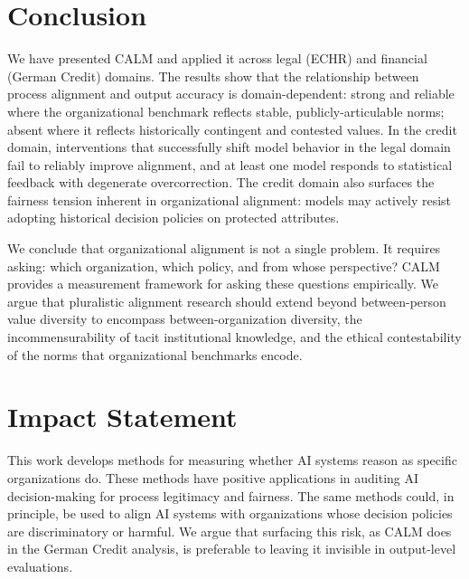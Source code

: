 \documentclass{article}
\begin{document}

\section{Conclusion}

We have presented CALM and applied it across legal (ECHR) and financial (German Credit) domains. The results show that the relationship between process alignment and output accuracy is domain-dependent: strong and reliable where the organizational benchmark reflects stable, publicly-articulable norms; absent where it reflects historically contingent and contested values. In the credit domain, interventions that successfully shift model behavior in the legal domain fail to reliably improve alignment, and at least one model responds to statistical feedback with degenerate overcorrection. The credit domain also surfaces the fairness tension inherent in organizational alignment: models may actively resist adopting historical decision policies on protected attributes.

We conclude that organizational alignment is not a single problem. It requires asking: which organization, which policy, and from whose perspective? CALM provides a measurement framework for asking these questions empirically. We argue that pluralistic alignment research should extend beyond between-person value diversity to encompass between-organization diversity, the incommensurability of tacit institutional knowledge, and the ethical contestability of the norms that organizational benchmarks encode.


\section*{Impact Statement}

This work develops methods for measuring whether AI systems reason as specific organizations do. These methods have positive applications in auditing AI decision-making for process legitimacy and fairness. The same methods could, in principle, be used to align AI systems with organizations whose decision policies are discriminatory or harmful. We argue that surfacing this risk, as CALM does in the German Credit analysis, is preferable to leaving it invisible in output-level evaluations.




\end{document}

